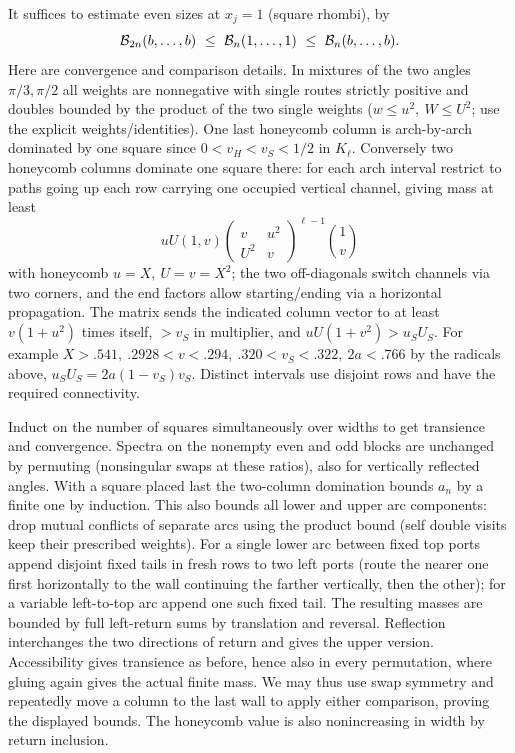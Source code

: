 \documentclass[11pt]{article}
\numberwithin{equation}{section}
\theoremstyle{definition}\newtheorem{definition}[theorem]{Definition}
\theoremstyle{remark}\newtheorem{remark}[theorem]{Remark}
\begin{document}
It suffices to estimate even sizes at \(x_j=1\) (square rhombi), by
\[
 {\cal B}_{2n}(b,\ldots,b)\ \le\ {\cal B}_n(1,\ldots,1)\ \le\ {\cal B}_n(b,\ldots,b).
\]
Here are convergence and comparison details. In mixtures of the two angles \(\pi/3,\pi/2\) all weights are nonnegative with single routes strictly positive and doubles bounded by the product of the two single weights (\(w\le u^2,\ W\le U^2\); use the explicit weights/identities). One last honeycomb column is arch-by-arch dominated by one square since \(0<v_H<v_S<1/2\) in \(K_\ell\). Conversely two honeycomb columns dominate one square there: for each arch interval restrict to paths going up each row carrying one occupied vertical channel, giving mass at least
\[
 uU(1,v)
 \begin{pmatrix}v&u^2\\ U^2&v\end{pmatrix}^{\ell-1}
 \binom{1}{v}
\]
with honeycomb \(u=X,\ U=v=X^2\); the two off-diagonals switch channels via two corners, and the end factors allow starting/ending via a horizontal propagation. The matrix sends the indicated column vector to at least \(v(1+u^2)\) times itself, \(>v_S\) in multiplier, and \(uU(1+v^2)>u_S U_S\). For example \(X>.541,\ .2928<v<.294,\ .320<v_S<.322,\ 2a<.766\) by the radicals above, \(u_SU_S=2a(1-v_S)v_S\). Distinct intervals use disjoint rows and have the required connectivity.

Induct on the number of squares simultaneously over widths to get transience and convergence. Spectra on the nonempty even and odd blocks are unchanged by permuting (nonsingular swaps at these ratios), also for vertically reflected angles. With a square placed last the two-column domination bounds \(a_n\) by a finite one by induction. This also bounds all lower and upper arc components: drop mutual conflicts of separate arcs using the product bound (self double visits keep their prescribed weights). For a single lower arc between fixed top ports append disjoint fixed tails in fresh rows to two left ports (route the nearer one first horizontally to the wall continuing the farther vertically, then the other); for a variable left-to-top arc append one such fixed tail. The resulting masses are bounded by full left-return sums by translation and reversal. Reflection interchanges the two directions of return and gives the upper version. Accessibility gives transience as before, hence also in every permutation, where gluing again gives the actual finite mass. We may thus use swap symmetry and repeatedly move a column to the last wall to apply either comparison, proving the displayed bounds. The honeycomb value is also nonincreasing in width by return inclusion.
\end{document}
